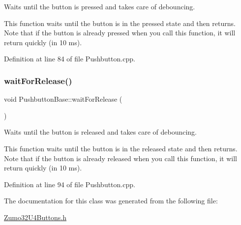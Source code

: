 Waits until the button is pressed and takes care of debouncing. 

This function waits until the button is in the pressed state and then returns. Note that if the button is already pressed when you call this function, it will return quickly (in 10 ms). 

Definition at line 84 of file Pushbutton.\+cpp.

\mbox{\label{class_pushbutton_base_ae5fff34b3e1ebd62fd02b99edd6bf13a}} 
\subsubsection{\texorpdfstring{wait\+For\+Release()}{waitForRelease()}}
{\footnotesize\ttfamily void Pushbutton\+Base\+::wait\+For\+Release (\begin{DoxyParamCaption}{ }\end{DoxyParamCaption})\hspace{0.3cm}{\ttfamily [inherited]}}



Waits until the button is released and takes care of debouncing. 

This function waits until the button is in the released state and then returns. Note that if the button is already released when you call this function, it will return quickly (in 10 ms). 

Definition at line 94 of file Pushbutton.\+cpp.



The documentation for this class was generated from the following file\+:\begin{DoxyCompactItemize}
\item 
\hyperlink{_zumo32_u4_buttons_8h}{Zumo32\+U4\+Buttons.\+h}\end{DoxyCompactItemize}
